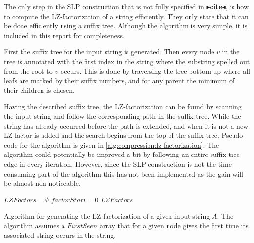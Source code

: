 \documentclass[twoside,11pt,openright]{report}
\newcommand{\todo}[1]{{\color[rgb]{.5,0,0}\textbf{$\blacktriangleright$#1$\blacktriangleleft$}}}
\begin{document}
The only step in the SLP construction that is not fully specified in \todo{cite}, is how to compute the LZ-factorization of a string efficiently. They only state that it can be done efficiently using a suffix tree. Although the algorithm is very simple, it is included in this report for completeness.

First the suffix tree for the input string is generated. Then every node $v$ in the tree is annotated with the first index in the string where the substring spelled out from the root to $v$ occurs. This is done by traversing the tree bottom up where all leafs are marked by their suffix numbers, and for any parent the minimum of their children is chosen.

Having the described suffix tree, the LZ-factorization can be found by scanning the input string and follow the corresponding path in the suffix tree. While the string has already occurred before the path is extended, and when it is not a new LZ factor is added and the search begins from the top of the suffix tree. Pseudo code for the algorithm is given in \cref{alg:compression:lz-factorization}. The algorithm could potentially be improved a bit by following an entire suffix tree edge in every iteration. However, since the SLP construction is not the time consuming part of the algorithm this has not been implemented as the gain will be almost non noticeable.

\begin{algorithm}[H]
  \label{alg:compression:lz-factorization}
  $LZFactors = \emptyset$\;
  $factorStart = 0$\;
  \Return $LZFactors$
  \caption{Algorithm for generating the LZ-factorization of a given input string $A$. The algorithm assumes a $FirstSeen$ array that for a given node gives the first time its associated string occurs in the string.}
\end{algorithm}
\end{document}
